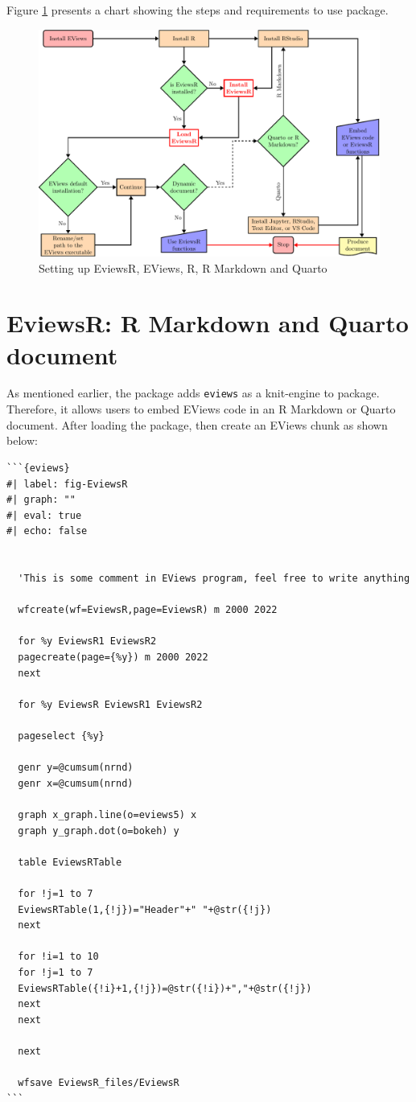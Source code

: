Figure \ref{fig:fig-flowchart} presents a chart showing the steps and requirements to use  package.

\begin{figure}

{\centering \includegraphics[height=0.3\textheight]{EviewsR_files/figure-latex/fig-flowchart-1} 

}

\caption{Setting up EviewsR, EViews, R, R Markdown and Quarto}\label{fig:fig-flowchart}
\end{figure}

\hypertarget{sec-document}{%
\section{EviewsR: R Markdown and Quarto document}\label{sec-document}}

As mentioned earlier, the  package adds \texttt{eviews} as a knit-engine to  package. Therefore, it allows users to embed EViews code in an R Markdown or Quarto document. After loading the package, then create an EViews chunk as shown below:

\begin{verbatim}
```{eviews}     
#| label: fig-EviewsR
#| graph: ""
#| eval: true
#| echo: false


  'This is some comment in EViews program, feel free to write anything
  
  wfcreate(wf=EviewsR,page=EviewsR) m 2000 2022

  for %y EviewsR1 EviewsR2
  pagecreate(page={%y}) m 2000 2022
  next

  for %y EviewsR EviewsR1 EviewsR2
  
  pageselect {%y}
  
  genr y=@cumsum(nrnd)
  genr x=@cumsum(nrnd)
  
  graph x_graph.line(o=eviews5) x
  graph y_graph.dot(o=bokeh) y
  
  table EviewsRTable

  for !j=1 to 7
  EviewsRTable(1,{!j})="Header"+" "+@str({!j})
  next

  for !i=1 to 10
  for !j=1 to 7
  EviewsRTable({!i}+1,{!j})=@str({!i})+","+@str({!j})
  next
  next 

  next
  
  wfsave EviewsR_files/EviewsR
```  
\end{verbatim}

